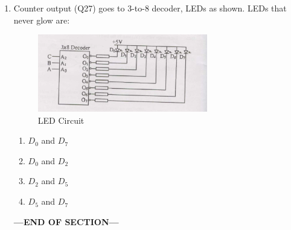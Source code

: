 \documentclass[journal,cmex10]{IEEEtran}
\theoremstyle{remark}
\numberwithin{equation}{enumi}
\numberwithin{figure}{enumi}
\begin{document}
\begin{enumerate}[label=\arabic*)]
    \item Counter output (Q27) goes to 3-to-8 decoder, LEDs as shown. LEDs that never glow are:
    \begin{figure}[htbp]
  \centering
  \includegraphics[width=0.7\textwidth]{figs/C/fig15.png}
  \caption{LED Circuit}
  \label{C/fig15.png}
\end{figure}
    \bigskip
    \hfill {}
    \begin{enumerate}[label=\alph*)]
        \item $D_0$ and $D_7$
        \item $D_0$ and $D_2$
        \item $D_2$ and $D_5$
        \item $D_5$ and $D_7$
    \end{enumerate}
    \bigskip

    \vspace{3\baselineskip}
    \begin{center}
    \textbf{\Large ---END OF SECTION---}
    \end{center}
\end{enumerate}

\newpage 

\end{document}
